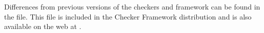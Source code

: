 
Differences from previous versions of the checkers and framework can be found
in the  file.  This file is included in the
Checker Framework distribution and is also available on the web at
.






